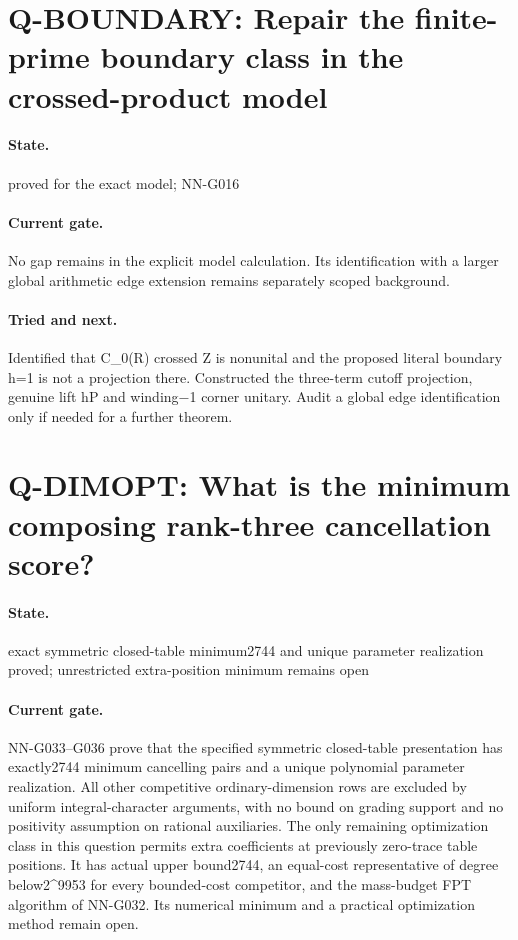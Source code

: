 \section{Q-BOUNDARY: Repair the finite-prime boundary class in the crossed-product model}
\paragraph{State.} proved for the exact model; NN-G016
\paragraph{Current gate.} No gap remains in the explicit model calculation. Its identification with a larger global arithmetic edge extension remains separately scoped background.
\paragraph{Tried and next.} Identified that C\_0(R) crossed Z is nonunital and the proposed literal boundary h=1 is not a projection there. Constructed the three-term cutoff projection, genuine lift hP and winding−1 corner unitary. Audit a global edge identification only if needed for a further theorem.

\section{Q-DIMOPT: What is the minimum composing rank-three cancellation score?}
\paragraph{State.} exact symmetric closed-table minimum2744 and unique parameter realization proved; unrestricted extra-position minimum remains open
\paragraph{Current gate.} NN-G033--G036 prove that the specified symmetric closed-table presentation has exactly2744 minimum cancelling pairs and a unique polynomial parameter realization. All other competitive ordinary-dimension rows are excluded by uniform integral-character arguments, with no bound on grading support and no positivity assumption on rational auxiliaries. The only remaining optimization class in this question permits extra coefficients at previously zero-trace table positions. It has actual upper bound2744, an equal-cost representative of degree below2\textasciicircum{}9953 for every bounded-cost competitor, and the mass-budget FPT algorithm of NN-G032. Its numerical minimum and a practical optimization method remain open.
